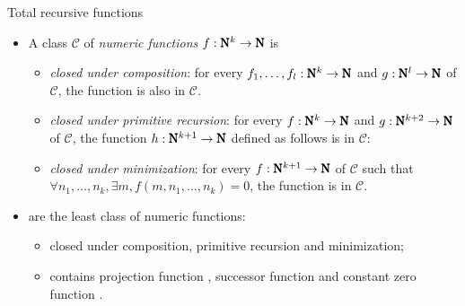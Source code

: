 \documentclass[paper=screen,mode=present,style=zysimple]{powerdot}
\begin{document}
\begin{slide}{Total recursive functions}
\begin{itemize}
\item A class $\mathcal C$ of {\em numeric functions} $f: \pmb{\mathrm{N}}^k \to \pmb{\mathrm{N}}$ is
\vspace*{-0.5em} 
\small
\begin{itemize}
\item {\em closed under composition}: for every $f_1, \ldots , f_l: \pmb{\mathrm{N}}^k \to \pmb{\mathrm{N}}$ and 
$g: \pmb{\mathrm{N}}^l \to \pmb{\mathrm{N}}$ of $\mathcal C$, the function 
 is 
also in $\mathcal C$.
\item {\em closed under primitive recursion}: for every $f: \pmb{\mathrm{N}}^k \to \pmb{\mathrm{N}}$ and 
  $g: \pmb{\mathrm{N}}^{k+2} \to \pmb{\mathrm{N}}$ of $\mathcal C$, the function $h: \pmb{\mathrm{N}}^{k+1} \to \pmb{\mathrm{N}} $ 
  defined as follows is in $\mathcal C$: \vspace*{-0.5em}
\item {\em closed under minimization}: for every $f: \pmb{\mathrm{N}}^{k+1} \to \pmb{\mathrm{N}}$ of $\mathcal C$ 
  such that $\forall n_1, \ldots, n_k, \exists m, f(m, n_1, \ldots, n_k) = 0$, 
  the function 
  is in $\mathcal C$.
\vspace*{-0.5em}
\end{itemize}
\normalsize
\item {} are the least class of numeric functions:
\vspace*{-0.5em}
\begin{itemize}
\item closed under composition, primitive recursion and minimization;
\item contains projection function , 
  successor function  
  and constant zero function .
\end{itemize}
\end{itemize}
\end{slide}
\end{document}

